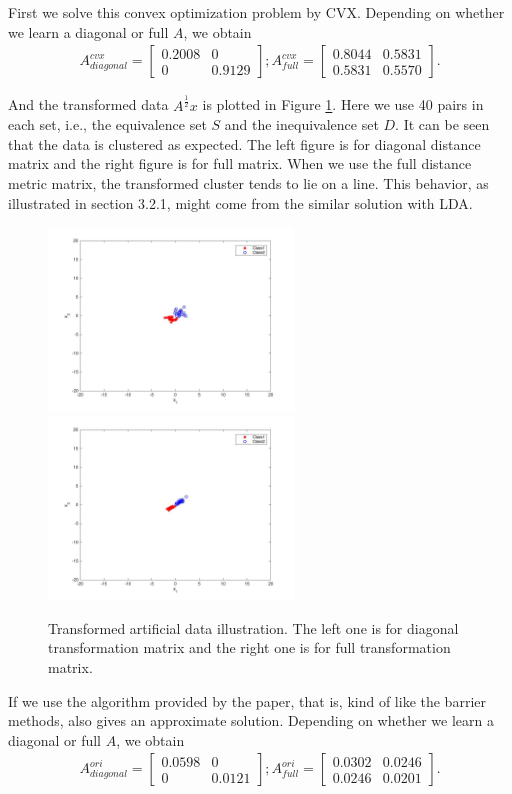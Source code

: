 \documentclass[12pt]{article}
\newcommand{\twomat}[4]{\begin{bmatrix} #1 & #2 \\ #3 & #4 \end{bmatrix}}
\begin{document}
First we solve this convex optimization problem by CVX. Depending on whether we learn a diagonal or full $A$, we obtain
\begin{align*}
 A_{diagonal}^{cvx} = \twomat{0.2008}{0}{0}{0.9129}; 
 A_{full}^{cvx} = \twomat{ 0.8044 }{0.5831}{0.5831}{0.5570}.
\end{align*}

And the transformed data $A^{\frac{1}{2}}x$ is plotted in Figure \ref{fig2}. Here we use 40 pairs in each set, i.e., the equivalence set $S$ and the inequivalence set $D$. It can be seen that the data is clustered as expected. The left figure is for diagonal distance matrix and the right figure is for full matrix. When we use the full distance metric matrix, the transformed cluster tends to lie on a line. This behavior, as illustrated in section 3.2.1, might come from the similar solution with LDA.
\begin{figure}[h]
\centering
\includegraphics[width=6.5cm]{fig/diagA_2.jpg}
\includegraphics[width=6.5cm]{fig/fullA_2.jpg}
\caption{Transformed artificial data illustration. The left one is for diagonal transformation matrix and the right one is for full transformation matrix.}
\label{fig2}
\end{figure}

If we use the algorithm provided by the paper, that is, kind of like the barrier methods, also gives an approximate solution. Depending on whether we learn a diagonal or full $A$, we obtain
\begin{align*}
 A_{diagonal}^{ori} = \twomat{0.0598}{0}{0}{0.0121}; 
 A_{full}^{ori} = \twomat{0.0302}{0.0246}{0.0246}{0.0201}.
\end{align*}
\end{document}
